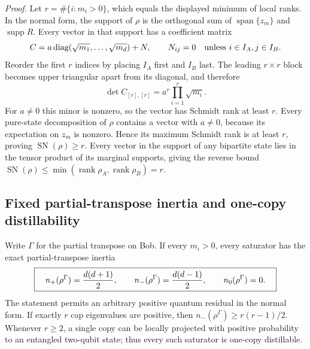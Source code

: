 \emph{Proof.} Let $r=\#\{i:m_i>0\}$, which equals the displayed minimum
of local ranks. In the normal form, the support of $\rho$ is the orthogonal
sum of $\operatorname{span}\{z_m\}$ and $\operatorname{supp}R$.
Every vector in that support has a coefficient matrix
\[
 C=a\operatorname{diag}(\sqrt{m_1},\ldots,\sqrt{m_d})+N,
 \qquad N_{ij}=0\quad\hbox{unless }i\in I_A, j\in I_B.
\]
Reorder the first $r$ indices by placing $I_A$ first and $I_B$ last.
The leading $r\times r$ block becomes upper triangular apart from its
diagonal, and therefore
\[
 \det C_{[r],[r]}=a^r\prod_{i=1}^r\sqrt{m_i}.
\]
For $a\ne0$ this minor is nonzero, so the vector has Schmidt rank at least
$r$. Every pure-state decomposition of $\rho$ contains a vector with
$a\ne0$, because its expectation on $z_m$ is nonzero. Hence its maximum
Schmidt rank is at least $r$, proving $\operatorname{SN}(\rho)\ge r$.
Every vector in the support of any bipartite state lies in the tensor product
of its marginal supports, giving the reverse bound $\operatorname{SN}(\rho)
\le\min(\operatorname{rank}\rho_A,\operatorname{rank}\rho_B)=r$.

\subsection{Fixed partial-transpose inertia and one-copy distillability}

Write $\Gamma$ for the partial transpose on Bob. If every $m_i>0$, every
saturator has the exact partial-transpose inertia
\[
 \boxed{\quad
 n_+(\rho^\Gamma)={d(d+1)\over2},\qquad
 n_-(\rho^\Gamma)={d(d-1)\over2},\qquad n_0(\rho^\Gamma)=0.
 \quad}
\]
The statement permits an arbitrary positive quantum residual in the normal
form. If exactly $r$ cap eigenvalues are positive, then
$n_-(\rho^\Gamma)\ge r(r-1)/2$. Whenever $r\ge2$, a single copy can be
locally projected with positive probability to an entangled two-qubit state;
thus every such saturator is one-copy distillable.


